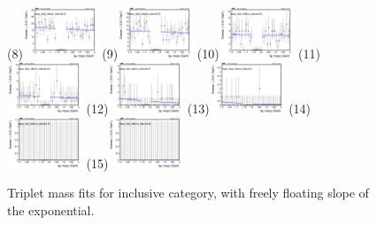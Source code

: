\begin{figure}[h!]
        \subfigure(8){\includegraphics[width=0.2\textwidth]{unfixed_exp/plots/all/massfit_all_40bins_bdtcut0.51.png}}
        \subfigure(9){\includegraphics[width=0.2\textwidth]{unfixed_exp/plots/all/massfit_all_40bins_bdtcut0.55.png}}
        \subfigure(10){\includegraphics[width=0.2\textwidth]{unfixed_exp/plots/all/massfit_all_40bins_bdtcut0.59.png}}
        \subfigure(11){\includegraphics[width=0.2\textwidth]{unfixed_exp/plots/all/massfit_all_40bins_bdtcut0.63.png}}
        \subfigure(12){\includegraphics[width=0.2\textwidth]{unfixed_exp/plots/all/massfit_all_40bins_bdtcut0.67.png}}
        \subfigure(13){\includegraphics[width=0.2\textwidth]{unfixed_exp/plots/all/massfit_all_40bins_bdtcut0.7.png}}
        \subfigure(14){\includegraphics[width=0.2\textwidth]{unfixed_exp/plots/all/massfit_all_40bins_bdtcut0.76.png}}
        \subfigure(15){\includegraphics[width=0.2\textwidth]{unfixed_exp/plots/all/massfit_all_40bins_bdtcut0.82.png}}
        \caption{Triplet mass fits for inclusive category, with freely floating slope of the exponential.}
        \label{fig:unfixed_all}
\end{figure}

